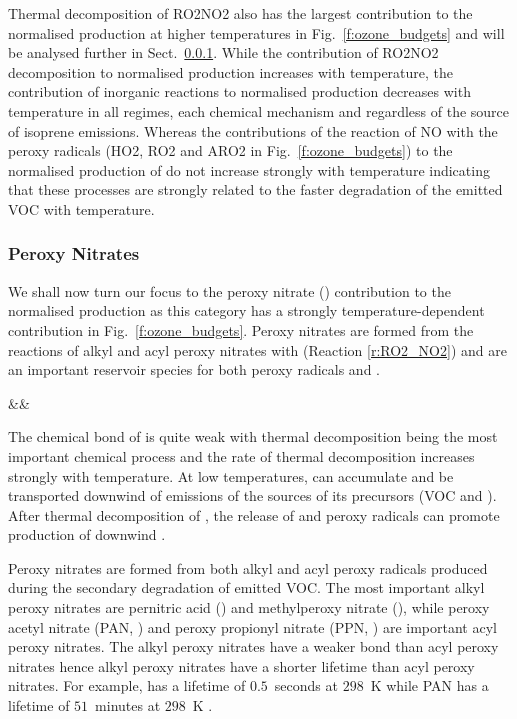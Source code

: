 Thermal decomposition of RO2NO2 also has the largest contribution to the normalised  production at higher temperatures in Fig.~\ref{f:ozone_budgets} and will be analysed further in Sect.~\ref{sss:ro2no2}.
While the contribution of RO2NO2 decomposition to normalised  production increases with temperature, the contribution of inorganic reactions to normalised  production decreases with temperature in all  regimes, each chemical mechanism and regardless of the source of isoprene emissions.
Whereas the contributions of the reaction of NO with the peroxy radicals (HO2, RO2 and ARO2 in Fig.~\ref{f:ozone_budgets}) to the normalised production of  do not increase strongly with temperature indicating that these processes are strongly related to the faster degradation of the emitted VOC with temperature.

\subsubsection{Peroxy Nitrates} \label{sss:ro2no2}
We shall now turn our focus to the peroxy nitrate () contribution to the normalised  production as this category has a strongly temperature-dependent contribution in Fig.~\ref{f:ozone_budgets}.
Peroxy nitrates are formed from the reactions of alkyl and acyl peroxy nitrates with  (Reaction \ref{r:RO2_NO2}) and are an important reservoir species for both peroxy radicals and .
\begin{rxnarray}
    &&  \rightleftharpoons {} \label{r:RO2_NO2}
\end{rxnarray}
The chemical bond of  is quite weak with thermal decomposition being the most important chemical process and the rate of thermal decomposition increases strongly with temperature.
At low temperatures,  can accumulate and be transported downwind of emissions of the sources of its precursors (VOC and ). 
After thermal decomposition of , the release of  and peroxy radicals can promote production of  downwind \citep{Moxim:1996}.

Peroxy nitrates are formed from both alkyl and acyl peroxy radicals produced during the secondary degradation of emitted VOC.
The most important alkyl peroxy nitrates are pernitric acid () and methylperoxy nitrate (), while peroxy acetyl nitrate (PAN, ) and peroxy propionyl nitrate (PPN, ) are important acyl peroxy nitrates.
The alkyl peroxy nitrates have a weaker  bond than acyl peroxy nitrates hence alkyl peroxy nitrates have a shorter lifetime than acyl peroxy nitrates.
For example,  has a lifetime of $0.5$~seconds at $298$~K while PAN has a lifetime of $51$~minutes at $298$~K \citep{Orlando:2012}.

